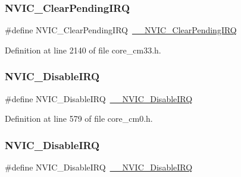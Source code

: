 \subsubsection{\texorpdfstring{N\+V\+I\+C\+\_\+\+Clear\+Pending\+I\+RQ}{NVIC\_ClearPendingIRQ}\hspace{0.1cm}{\footnotesize\ttfamily [13/13]}}
{\footnotesize\ttfamily \#define N\+V\+I\+C\+\_\+\+Clear\+Pending\+I\+RQ~\hyperlink{group___c_m_s_i_s___core___n_v_i_c_functions_ga562a86dbdf14827d0fee8fdafb04d191}{\+\_\+\+\_\+\+N\+V\+I\+C\+\_\+\+Clear\+Pending\+I\+RQ}}



Definition at line 2140 of file core\+\_\+cm33.\+h.

\mbox{\label{group___c_m_s_i_s___core___n_v_i_c_functions_ga73b4e251f59cab4e9a5e234aac02ae57}} 
\subsubsection{\texorpdfstring{N\+V\+I\+C\+\_\+\+Disable\+I\+RQ}{NVIC\_DisableIRQ}\hspace{0.1cm}{\footnotesize\ttfamily [1/13]}}
{\footnotesize\ttfamily \#define N\+V\+I\+C\+\_\+\+Disable\+I\+RQ~\hyperlink{group___c_m_s_i_s___core___n_v_i_c_functions_gae016e4c1986312044ee768806537d52f}{\+\_\+\+\_\+\+N\+V\+I\+C\+\_\+\+Disable\+I\+RQ}}



Definition at line 579 of file core\+\_\+cm0.\+h.

\mbox{\label{group___c_m_s_i_s___core___n_v_i_c_functions_ga73b4e251f59cab4e9a5e234aac02ae57}} 
\subsubsection{\texorpdfstring{N\+V\+I\+C\+\_\+\+Disable\+I\+RQ}{NVIC\_DisableIRQ}\hspace{0.1cm}{\footnotesize\ttfamily [2/13]}}
{\footnotesize\ttfamily \#define N\+V\+I\+C\+\_\+\+Disable\+I\+RQ~\hyperlink{group___c_m_s_i_s___core___n_v_i_c_functions_gae016e4c1986312044ee768806537d52f}{\+\_\+\+\_\+\+N\+V\+I\+C\+\_\+\+Disable\+I\+RQ}}




